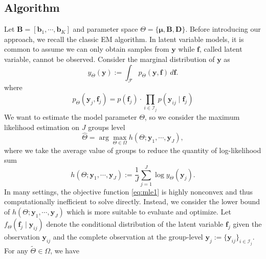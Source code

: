 \documentclass[]{report}
\theoremstyle{definition}
\begin{document}
\subsection{Algorithm}
Let $\mathbf{B}=[\bm{b}_{1},\cdots, \bm{b}_{K}]$ and parameter space $\Theta=\{\bm{\mu},\mathbf{B}, \mathbf{D}\}$. Before introducing our approach, we recall the classic EM algorithm. In latent variable models, it is common to assume we can only obtain samples from $\bm{y}$ while $\bm{f}$, called latent variable, cannot be observed. Consider the marginal distribution of $\bm{y}$ as
\begin{equation}
    y_{\Theta}(\bm{y}):= \int_{\mathcal{F}} p_{\Theta}(\bm{y},\bm{f})\, d\bm{f}.
\end{equation}
where
\begin{equation}
    p_{\Theta}(\bm{y}_{j},\bm{f}_{j})=p(\bm{f}_{j})\cdot \prod_{i\in \mathcal{I}_{j}} p(\bm{y}_{ij}\mid \bm{f}_{j})
\end{equation}
We want to estimate the model parameter $\Theta$, so we consider the maximum likelihood estimation on $J$ groups level
\begin{equation}
    \hat{\Theta}=\arg\max\limits_{\Theta \in \Omega}h(\Theta; \bm{y}_{1},\cdots,\bm{y}_{J}),
    \label{eq:mle1}
\end{equation}
where we take the average value of groups to reduce the quantity of log-likelihood sum
\begin{equation}
    h(\Theta; \bm{y}_{1},\cdots,\bm{y}_{J}):=\dfrac{1}{J} \sum_{j=1}^{J} \log y_{\Theta}(\bm{y}_{j}).
\end{equation}
In many settings, the objective function \ref{eq:mle1} is highly nonconvex and thus computationally inefficient to solve directly. Instead, we consider the lower bound of $ h(\Theta; \bm{y}_{1},\cdots,\bm{y}_{J})$ which is more suitable to evaluate and optimize. Let $f_{\Theta}(\bm{f}_{j}\mid \bm{y}_{ij})$ denote the conditional distribution of the latent variable $\bm{f}_{j}$ given the observation $\bm{y}_{ij}$ and the complete observation at the group-level $\bm{y}_{j}:=\{\bm{y}_{ij}\}_{i\in \mathcal{I}_{j}}$. For any $\tilde{\Theta}\in \Omega$, we have 
\end{document}
